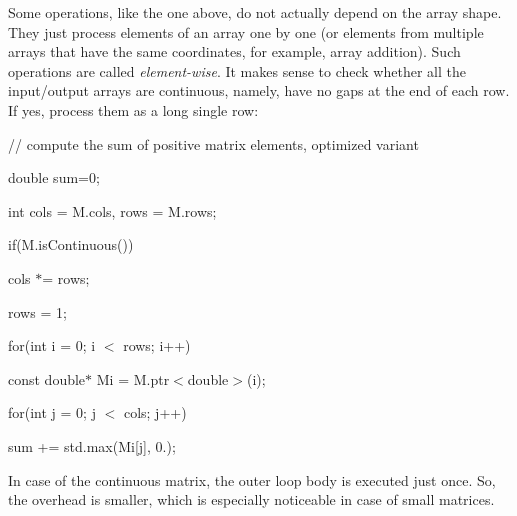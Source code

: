 {\ttfamily Some operations, like the one above, do not actually depend on the array shape. They just process elements of an array one by one (or elements from multiple arrays that have the same coordinates, for example, array addition). Such operations are called {\itshape element-\/wise}. It makes sense to check whether all the input/output arrays are continuous, namely, have no gaps at the end of each row. If yes, process them as a long single row\+:}

{\ttfamily }

{\ttfamily }

{\ttfamily // compute the sum of positive matrix elements, optimized variant}

{\ttfamily }

{\ttfamily }

{\ttfamily double sum=0;}

{\ttfamily }

{\ttfamily }

{\ttfamily int cols = M.\+cols, rows = M.\+rows;}

{\ttfamily }

{\ttfamily }

{\ttfamily if(M.\+is\+Continuous())}

{\ttfamily }

{\ttfamily }

{\ttfamily cols $\ast$= rows;}

{\ttfamily }

{\ttfamily }

{\ttfamily rows = 1;}

{\ttfamily }

{\ttfamily }

{\ttfamily for(int i = 0; i $<$ rows; i++)}

{\ttfamily }

{\ttfamily }

{\ttfamily const double$\ast$ Mi = M.\+ptr$<$double$>$(i);}

{\ttfamily }

{\ttfamily }

{\ttfamily for(int j = 0; j $<$ cols; j++)}

{\ttfamily }

{\ttfamily }

{\ttfamily sum += std.\+max(Mi\mbox{[}j\mbox{]}, 0.);}

{\ttfamily }

{\ttfamily }

{\ttfamily In case of the continuous matrix, the outer loop body is executed just once. So, the overhead is smaller, which is especially noticeable in case of small matrices. }

